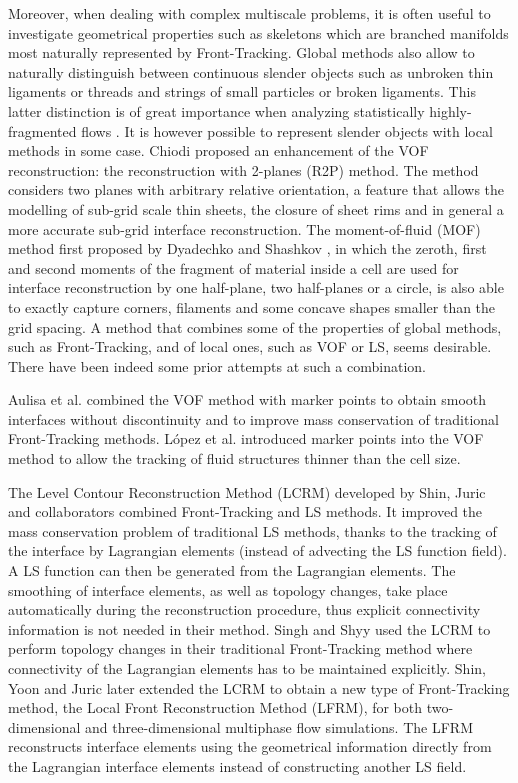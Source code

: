 Moreover, when dealing with complex multiscale problems, it is often useful to investigate geometrical properties such as skeletons \cite{chen2022characterizing} which are branched manifolds most naturally represented by Front-Tracking. 
Global methods also allow to naturally distinguish between continuous slender objects such as unbroken thin ligaments or threads and strings of small particles or broken ligaments. This latter distinction is of great importance when analyzing statistically highly-fragmented flows \cite{Chirco_2022_467}. 
It is however possible to represent slender objects with local methods in some case. Chiodi \cite{Chiodi_2020_phd} proposed an enhancement of the VOF reconstruction: the reconstruction with 2-planes (R2P) method. The method considers two planes with arbitrary relative orientation, a feature that allows the modelling of sub-grid scale thin sheets, the closure of sheet rims and in general a more accurate sub-grid interface reconstruction. 
The moment-of-fluid (MOF) method \cite{Shashkov_2023_479, Shashkov_2023_494} first proposed by 
Dyadechko and Shashkov \cite{Dyadechko_2008_227}, in which the zeroth, first and second moments of the fragment of material inside a cell are used for interface reconstruction by one half-plane, two half-planes or a circle, is also able to exactly capture corners, filaments and some concave shapes smaller than the grid spacing.
A method that combines some of the properties of global methods, such as Front-Tracking, and of local ones, such as VOF or LS,
seems desirable. There have been indeed some prior attempts at such a combination.

Aulisa et al. \cite{Aulisa_2003_188, Aulisa_2004_197} combined the VOF method with marker points to obtain smooth
interfaces without discontinuity and to improve mass conservation of traditional Front-Tracking methods. L\'{o}pez et al. \cite{Lopez_2005_208} introduced marker points into the VOF method to allow the tracking of fluid structures thinner than the cell size.

The Level Contour Reconstruction Method (LCRM) developed by Shin, Juric and collaborators \cite{Shin_2002_180, Shin_2005_203, Shin_2007_21} combined Front-Tracking and LS methods. It improved the mass conservation problem of traditional LS methods, thanks to the tracking of the interface by Lagrangian elements (instead of advecting the LS function field).
%
A LS function can then be generated from the Lagrangian elements.
%
The smoothing of interface elements, as well as topology changes, take place automatically during the reconstruction procedure, thus explicit connectivity information is not needed in their method. Singh and Shyy \cite{Singh_2007_224} used the LCRM to perform topology changes in their traditional Front-Tracking method where connectivity of the Lagrangian elements has to be maintained explicitly.
%
Shin, Yoon and Juric \cite{Shin_2011_230} later extended the LCRM to obtain a new type of Front-Tracking method, the Local Front Reconstruction Method (LFRM), for both two-dimensional and three-dimensional multiphase flow simulations. The LFRM reconstructs interface elements using the geometrical information directly from the Lagrangian interface elements instead of constructing another LS field.

